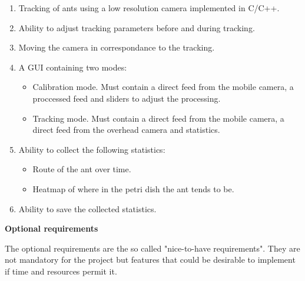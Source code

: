 \begin{enumerate}
    \item Tracking of ants using a low resolution camera implemented in C/C++.
    \item Ability to adjust tracking parameters before and during tracking.
    \item Moving the camera in correspondance to the tracking.
	\item A GUI containing two modes:
    \begin{itemize}
        \item Calibration mode. Must contain a direct feed from the mobile camera, a proccessed feed and sliders to adjust the processing.
        \item Tracking mode. Must contain a direct feed from the mobile camera, a direct feed from the overhead camera and statistics.
    \end{itemize}
    \item Ability to collect the following statistics:
    \begin{itemize}
        \item Route of the ant over time.
        \item Heatmap of where in the petri dish the ant tends to be.
    \end{itemize}
    \item Ability to save the collected statistics.
\end{enumerate}

\noindent \textbf{Optional requirements} \par
The optional requirements are the so called "nice-to-have requirements". They are not mandatory for the project but features that could be desirable to implement if time and resources permit it.

